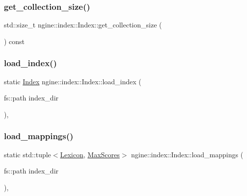 \subsubsection{\texorpdfstring{get\+\_\+collection\+\_\+size()}{get\_collection\_size()}}
{\footnotesize\ttfamily std\+::size\+\_\+t ngine\+::index\+::\+Index\+::get\+\_\+collection\+\_\+size (\begin{DoxyParamCaption}{ }\end{DoxyParamCaption}) const\hspace{0.3cm}{\ttfamily [inline]}}

\mbox{\label{classngine_1_1index_1_1Index_a833aa7f67059cc44567e9752526ebe2e}} 
\subsubsection{\texorpdfstring{load\+\_\+index()}{load\_index()}}
{\footnotesize\ttfamily static \hyperlink{classngine_1_1index_1_1Index}{Index} ngine\+::index\+::\+Index\+::load\+\_\+index (\begin{DoxyParamCaption}\item[{fs\+::path}]{index\+\_\+dir }\end{DoxyParamCaption})\hspace{0.3cm}{\ttfamily [inline]}, {\ttfamily [static]}}

\mbox{\label{classngine_1_1index_1_1Index_a55128a0d53ab461b7a90887eb0d9297e}} 
\subsubsection{\texorpdfstring{load\+\_\+mappings()}{load\_mappings()}}
{\footnotesize\ttfamily static std\+::tuple$<$\hyperlink{namespacengine_a97aa1030dca95ffefec4e7487a155015}{Lexicon}, \hyperlink{namespacengine_a92bfb5e91078f4b4dffe6f960f0f2016}{Max\+Scores}$>$ ngine\+::index\+::\+Index\+::load\+\_\+mappings (\begin{DoxyParamCaption}\item[{fs\+::path}]{index\+\_\+dir }\end{DoxyParamCaption})\hspace{0.3cm}{\ttfamily [inline]}, {\ttfamily [static]}}

